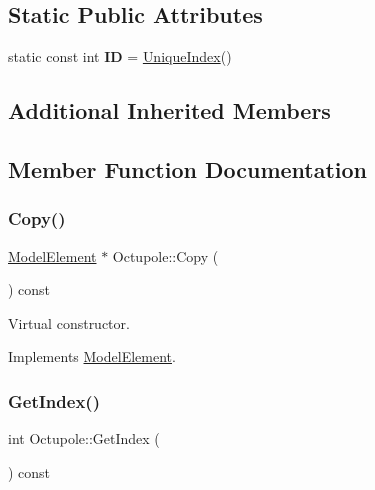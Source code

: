 \subsection*{Static Public Attributes}
\begin{DoxyCompactItemize}
\item 
\mbox{\label{classOctupole_a6f5d63cb353ca987b06ab5c13245c42b}} 
static const int {\bfseries ID} = \hyperlink{classAcceleratorComponent_aa7ad4d39e1a488b705983842ed1ac784}{Unique\+Index}()
\end{DoxyCompactItemize}
\subsection*{Additional Inherited Members}


\subsection{Member Function Documentation}
\mbox{\label{classOctupole_a41df65c2095e03ee2347a7b3b986baa1}} 
\subsubsection{\texorpdfstring{Copy()}{Copy()}}
{\footnotesize\ttfamily \hyperlink{classModelElement}{Model\+Element} $\ast$ Octupole\+::\+Copy (\begin{DoxyParamCaption}{ }\end{DoxyParamCaption}) const\hspace{0.3cm}{\ttfamily [virtual]}}

Virtual constructor. 

Implements \hyperlink{classModelElement_ac3ca26d649bd86a0f31a58ae09941429}{Model\+Element}.

\mbox{\label{classOctupole_acf28f59d4bb7f7ad6729e23902915d2b}} 
\subsubsection{\texorpdfstring{Get\+Index()}{GetIndex()}}
{\footnotesize\ttfamily int Octupole\+::\+Get\+Index (\begin{DoxyParamCaption}{ }\end{DoxyParamCaption}) const\hspace{0.3cm}{\ttfamily [virtual]}}

